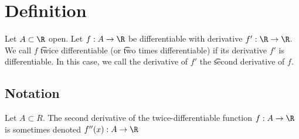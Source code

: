 
\section*{Definition}

Let $A \subset \R $ open.
Let $f: A \to \R $ be differentiable with derivative $f': \R \to \R $.
We call $f$ \t{twice differentiable} (or \t{two times differentiable}) if its derivative $f'$ is differentiable.
In this case, we call the derivative of $f'$ the \t{second derivative} of $f$.

\subsection*{Notation}

Let $A \subset R$.
The second derivative of the twice-differentiable function $f: A \to \R $ is sometimes denoted $f''(x): A \to \R $

\blankpage